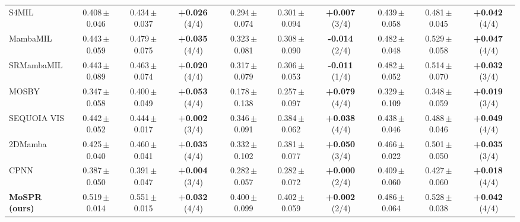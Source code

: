 \begin{tabular}{lccccccccc}
S4MIL & 0.408\,{\tiny$\pm$0.046} & 0.434\,{\tiny$\pm$0.037} & \textbf{+0.026}\,{\tiny(4/4)} & 0.294\,{\tiny$\pm$0.074} & 0.301\,{\tiny$\pm$0.094} & \textbf{+0.007}\,{\tiny(3/4)} & 0.439\,{\tiny$\pm$0.058} & 0.481\,{\tiny$\pm$0.045} & \textbf{+0.042}\,{\tiny(4/4)}\\
MambaMIL & 0.443\,{\tiny$\pm$0.059} & 0.479\,{\tiny$\pm$0.075} & \textbf{+0.035}\,{\tiny(4/4)} & 0.323\,{\tiny$\pm$0.081} & 0.308\,{\tiny$\pm$0.090} & \textbf{-0.014}\,{\tiny(2/4)} & 0.482\,{\tiny$\pm$0.048} & 0.529\,{\tiny$\pm$0.058} & \textbf{+0.047}\,{\tiny(4/4)}\\
SRMambaMIL & 0.443\,{\tiny$\pm$0.089} & 0.463\,{\tiny$\pm$0.074} & \textbf{+0.020}\,{\tiny(4/4)} & 0.317\,{\tiny$\pm$0.079} & 0.306\,{\tiny$\pm$0.053} & \textbf{-0.011}\,{\tiny(1/4)} & 0.482\,{\tiny$\pm$0.052} & 0.514\,{\tiny$\pm$0.070} & \textbf{+0.032}\,{\tiny(3/4)}\\
MOSBY & 0.347\,{\tiny$\pm$0.058} & 0.400\,{\tiny$\pm$0.049} & \textbf{+0.053}\,{\tiny(4/4)} & 0.178\,{\tiny$\pm$0.138} & 0.257\,{\tiny$\pm$0.097} & \textbf{+0.079}\,{\tiny(4/4)} & 0.329\,{\tiny$\pm$0.109} & 0.348\,{\tiny$\pm$0.059} & \textbf{+0.019}\,{\tiny(3/4)}\\
SEQUOIA VIS & 0.442\,{\tiny$\pm$0.052} & 0.444\,{\tiny$\pm$0.017} & \textbf{+0.002}\,{\tiny(3/4)} & 0.346\,{\tiny$\pm$0.091} & 0.384\,{\tiny$\pm$0.062} & \textbf{+0.038}\,{\tiny(4/4)} & 0.438\,{\tiny$\pm$0.046} & 0.488\,{\tiny$\pm$0.046} & \textbf{+0.049}\,{\tiny(4/4)}\\
2DMamba & 0.425\,{\tiny$\pm$0.040} & 0.460\,{\tiny$\pm$0.041} & \textbf{+0.035}\,{\tiny(4/4)} & 0.332\,{\tiny$\pm$0.102} & 0.381\,{\tiny$\pm$0.077} & \textbf{+0.050}\,{\tiny(3/4)} & 0.466\,{\tiny$\pm$0.022} & 0.501\,{\tiny$\pm$0.050} & \textbf{+0.035}\,{\tiny(3/4)}\\
CPNN & 0.387\,{\tiny$\pm$0.050} & 0.391\,{\tiny$\pm$0.047} & \textbf{+0.004}\,{\tiny(3/4)} & 0.282\,{\tiny$\pm$0.057} & 0.282\,{\tiny$\pm$0.072} & \textbf{+0.000}\,{\tiny(2/4)} & 0.409\,{\tiny$\pm$0.060} & 0.427\,{\tiny$\pm$0.060} & \textbf{+0.018}\,{\tiny(4/4)}\\
\textbf{MoSPR (ours)} & 0.519\,{\tiny$\pm$0.014} & 0.551\,{\tiny$\pm$0.015} & \textbf{+0.032}\,{\tiny(4/4)} & 0.400\,{\tiny$\pm$0.099} & 0.402\,{\tiny$\pm$0.059} & \textbf{+0.002}\,{\tiny(2/4)} & 0.486\,{\tiny$\pm$0.064} & 0.528\,{\tiny$\pm$0.038} & \textbf{+0.042}\,{\tiny(4/4)}\\
\bottomrule
\end{tabular}
